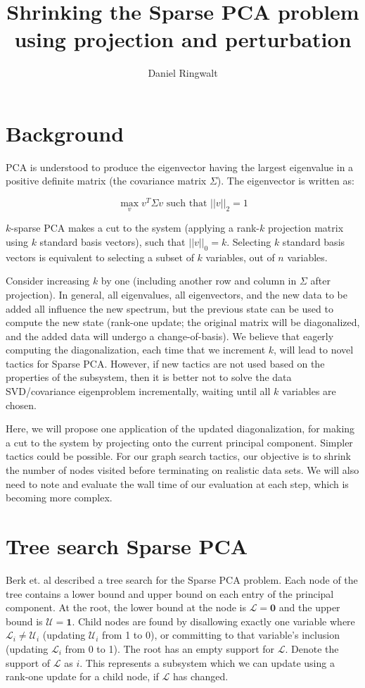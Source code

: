 \documentclass{article}
\title{Shrinking the Sparse PCA problem using projection and perturbation}
\author{Daniel Ringwalt}
\begin{document}
	
\maketitle

\section{Background}

PCA is understood to produce the eigenvector having the largest eigenvalue in a positive definite matrix (the covariance matrix $\Sigma$). The eigenvector is written as:

$$\max_v v^T \Sigma v \text{ such that } ||v||_2 = 1$$

$k$-sparse PCA makes a cut to the system (applying a rank-$k$ projection matrix using $k$ standard basis vectors), such that $||v||_0 = k$. Selecting $k$ standard basis vectors is equivalent to selecting a subset of $k$ variables, out of $n$ variables.

Consider increasing $k$ by one (including another row and column in $\Sigma$ after projection). In general, all eigenvalues, all eigenvectors, and the new data to be added all influence the new spectrum, but the previous state can be used to compute the new state (rank-one update; the original matrix will be diagonalized, and the added data will undergo a change-of-basis). We believe that eagerly computing the diagonalization, each time that we increment $k$, will lead to novel tactics for Sparse PCA. However, if new tactics are not used based on the properties of the subsystem, then it is better not to solve the data SVD/covariance eigenproblem incrementally, waiting until all $k$ variables are chosen.

Here, we will propose one application of the updated diagonalization, for making a cut to the system by projecting onto the current principal component. Simpler tactics could be possible. For our graph search tactics, our objective is to shrink the number of nodes visited before terminating on realistic data sets. We will also need to note and evaluate the wall time of our evaluation at each step, which is becoming more complex.

\section{Tree search Sparse PCA}

Berk et. al described a tree search for the Sparse PCA problem. Each node of the tree contains a lower bound and upper bound on each entry of the principal component. At the root, the lower bound at the node is $\mathcal{L} = \mathbf{0}$ and the upper bound is $\mathcal{U} = \mathbf{1}$. Child nodes are found by disallowing exactly one variable where $\mathcal{L}_i \not= \mathcal{U}_i$ (updating $\mathcal{U}_i$ from 1 to 0), or committing to that variable's inclusion (updating $\mathcal{L}_i$ from 0 to 1). The root has an empty support for $\mathcal{L}$. Denote the support of $\mathcal{L}$ as $i$. This represents a subsystem which we can update using a rank-one update for a child node, if $\mathcal{L}$ has changed.
\end{document}
